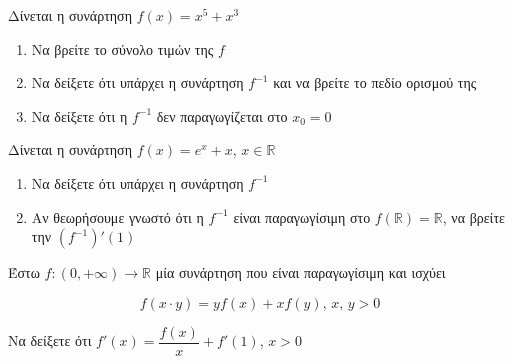 \documentclass{presentation}
\begin{document}
\begin{askisi}
    Δίνεται η συνάρτηση $f(x)=x^5+x^3$
    \begin{enumerate}
        \item<1-> Να βρείτε το σύνολο τιμών της $f$
        \item<2-> Να δείξετε ότι υπάρχει η συνάρτηση $f^{-1}$ και να βρείτε το πεδίο ορισμού της
        \item<3-> Να δείξετε ότι η $f^{-1}$ δεν παραγωγίζεται στο $x_0=0$
    \end{enumerate}

\end{askisi}

\begin{askisi}
    Δίνεται η συνάρτηση $f(x)=e^x+x$, $x\in\mathbb{R}$
    \begin{enumerate}
        \item<1-> Να δείξετε ότι υπάρχει η συνάρτηση $f^{-1}$
        \item<2-> Αν θεωρήσουμε γνωστό ότι η $f^{-1}$ είναι παραγωγίσιμη στο $f(\mathbb{R})=\mathbb{R}$, να βρείτε την $(f^{-1})'(1)$
    \end{enumerate}

\end{askisi}

\begin{askisi}
    Έστω $f:(0,+\infty)\to\mathbb{R}$ μία συνάρτηση που είναι παραγωγίσιμη και ισχύει

    $$f(x\cdot y)=yf(x)+xf(y) \text{, } x \text{, } y>0$$

    Να δείξετε ότι $f'(x)=\dfrac{f(x)}{x}+f'(1)$, $x>0$

\end{askisi}
\end{document}
